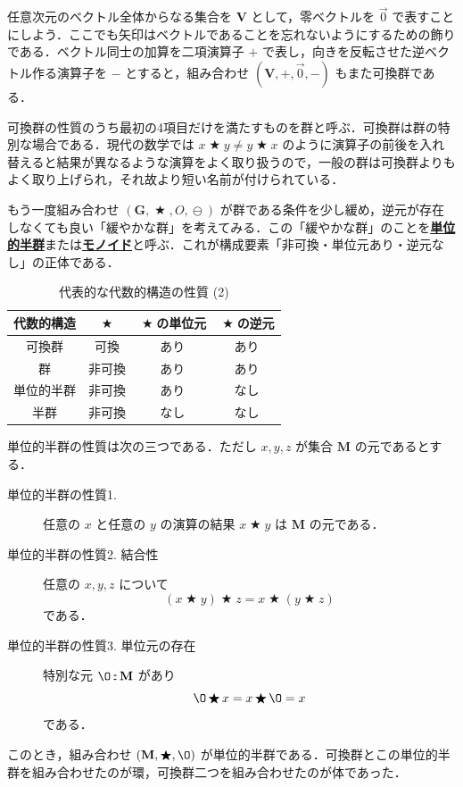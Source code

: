 \documentclass[a4paper,twocolumn]{jsbook}
\newcommand{\keyword}[1]{{\underline{\textbf{#1}}}}
\newcommand{\mZero}{\O}
\DeclareMathOperator{\mBinOp}{\bigstar}
\DeclareMathOperator{\mIn}{{:\!:}}
\DeclareMathOperator{\mMinus}{\ominus}
\newcommand{\mSet}[1]{\mathbf{#1}}
\newcommand{\mTupleWith}[1]{\left(#1\right)}
\newcommand{\mVec}[1]{\Vec{#1}}
\begin{document}
任意次元のベクトル全体からなる集合を $\mSet{V}$ として，零ベクトルを $\mVec{0}$ で表すことにしよう．ここでも矢印はベクトルであることを忘れないようにするための飾りである．ベクトル同士の加算を二項演算子 $+$ で表し，向きを反転させた逆ベクトル作る演算子を $-$ とすると，組み合わせ $\mTupleWith{\mSet{V},+,\mVec{0},-}$ もまた可換群である．

可換群の性質のうち最初の4項目だけを満たすものを群と呼ぶ．可換群は群の特別な場合である．現代の数学では $x\mBinOp y\neq y\mBinOp x$ のように演算子の前後を入れ替えると結果が異なるような演算をよく取り扱うので，一般の群は可換群よりもよく取り上げられ，それ故より短い名前が付けられている．

もう一度組み合わせ $\mTupleWith{\mSet{G},\mBinOp,O,\mMinus}$ が群である条件を少し緩め，逆元が存在しなくても良い「緩やかな群」を考えてみる．この「緩やかな群」のことを\keyword{単位的半群}または\keyword{モノイド}と呼ぶ．これが構成要素「非可換・単位元あり・逆元なし」の正体である．

\begin{table}
\caption{代表的な代数的構造の性質 (2)}
\label{tab:group-and-monoid}
\begin{center}
\begin{tabular}{||c||c|c|c||}
\hline
代数的構造&$\mBinOp$&$\mBinOp$の単位元&$\mBinOp$の逆元\\
\hline\hline
可換群&可換&あり&あり\\
群&非可換&あり&あり\\
単位的半群&非可換&あり&なし\\
半群&非可換&なし&なし\\
\hline
\end{tabular}
\end{center}
\end{table}

単位的半群の性質は次の三つである．ただし $x,y,z$ が集合 $\mSet{M}$ の元であるとする．
\begin{description}
\item[単位的半群の性質1.] 任意の $x$ と任意の $y$ の演算の結果 $x\mBinOp y$ は $\mSet{M}$ の元である．
\item[単位的半群の性質2. 結合性] 任意の $x,y,z$ について
\begin{equation}
(x\mBinOp y)\mBinOp z=x\mBinOp(y\mBinOp z)
\end{equation}
である．
\item[単位的半群の性質3. 単位元の存在] 特別な元 $\mZero\mIn\mSet{M}$ があり
\begin{equation}
\mZero\mBinOp x=x\mBinOp\mZero=x
\end{equation}
である．
\end{description}
このとき，組み合わせ $\mTupleWith{\mSet{M},\mBinOp,\mZero}$ が単位的半群である．可換群とこの単位的半群を組み合わせたのが環，可換群二つを組み合わせたのが体であった．
\end{document}
